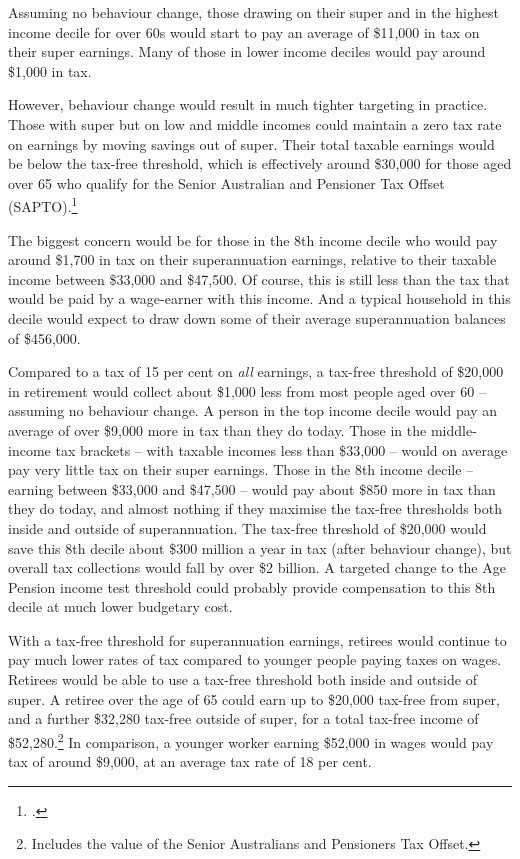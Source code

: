 Assuming no behaviour change, those drawing on their super and in the highest income decile for over 60s would start to pay an average of \$11,000 in tax on their super earnings. Many of those in lower income deciles would pay around \$1,000 in tax.

However, behaviour change would result in much tighter targeting in practice. Those with super but on low and middle incomes could maintain a zero tax rate on earnings by moving savings out of super. Their total taxable earnings would be below the tax-free threshold, which is effectively around \$30,000 for those aged over 65 who qualify for the Senior Australian and Pensioner Tax Offset (SAPTO).\footcite{ATO2015-Beneficiary-tax-offset-sapto-calculator}  

The biggest concern would be for those in the 8th income decile who would pay around \$1,700 in tax on their superannuation earnings, relative to their taxable income between \$33,000 and \$47,500. Of course, this is still less than the tax that would be paid by a wage-earner with this income. And a typical household in this decile would expect to draw down some of their average superannuation balances of \$456,000.

Compared to a tax of 15 per cent on \emph{all} earnings, a tax-free threshold of \$20,000 in retirement would collect about \$1,000 less from most people aged over 60 – assuming no behaviour change. A person in the top income decile would pay an average of over \$9,000 more in tax than they do today. Those in the middle-income tax brackets – with taxable incomes less than \$33,000 – would on average pay very little tax on their super earnings. Those in the 8th income decile – earning between \$33,000 and \$47,500 – would pay about \$850 more in tax than they do today, and almost nothing if they maximise the tax-free thresholds both inside and outside of superannuation. The tax-free threshold of \$20,000 would save this 8th decile about \$300 million a year in tax (after behaviour change), but overall tax collections would fall by over \$2 billion. A targeted change to the Age Pension income test threshold could probably provide compensation to this 8th decile at much lower budgetary cost. 

With a tax-free threshold for superannuation earnings, retirees would continue to pay much lower rates of tax compared to younger people paying taxes on wages. Retirees would be able to use a tax-free threshold both inside and outside of super. A retiree over the age of 65 could earn up to \$20,000 tax-free from super, and a further \$32,280 tax-free outside of super, for a total tax-free income of \$52,280.\footnote{Includes the value of the Senior Australians and Pensioners Tax Offset.} In comparison, a younger worker earning \$52,000 in wages would pay tax of around \$9,000, at an average tax rate of 18 per cent.

